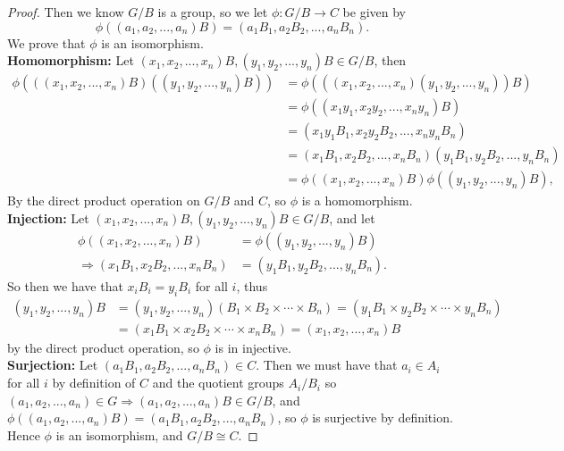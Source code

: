 \documentclass[10pt,oneside,reqno]{amsart}
\theoremstyle{plain}
\theoremstyle{definition}
\begin{document}
\begin{proof}
Then we know $G/B$ is a group, so we let $\phi: G/B \rightarrow C$ be given by $$\phi((a_1,a_2,...,a_n)B) = (a_1B_1,a_2B_2,...,a_nB_n).$$ 
We prove that $\phi$ is an isomorphism.\\
\textbf{Homomorphism: } Let $(x_1,x_2,...,x_n)B,(y_1,y_2,...,y_n)B \in G/B$, then 
\begin{equation}
\begin{aligned}
\phi(((x_1,x_2,...,x_n)B)((y_1,y_2,...,y_n)B)) &= \phi(((x_1,x_2,...,x_n)(y_1,y_2,...,y_n))B)\\ 
&= \phi((x_1y_1,x_2y_2,...,x_ny_n)B) \\
&= (x_1y_1B_1,x_2y_2B_2,...,x_ny_nB_n)\\
 &= (x_1B_1,x_2B_2,...,x_nB_n)(y_1B_1,y_2B_2,...,y_nB_n)\\
  &= \phi((x_1,x_2,...,x_n)B)\phi((y_1,y_2,...,y_n)B), 
\end{aligned}
\end{equation}
By the direct product operation on $G/B$ and $C$, so $\phi$ is a homomorphism. \\ 
\textbf{Injection: } Let $(x_1,x_2,...,x_n)B,(y_1,y_2,...,y_n)B \in G/B$, and let 
\begin{equation}
\begin{aligned}
\phi((x_1,x_2,...,x_n)B) &= \phi((y_1,y_2,...,y_n)B)\\
\Rightarrow  (x_1B_1,x_2B_2,...,x_nB_n)&=(y_1B_1,y_2B_2,...,y_nB_n). 
\end{aligned}
\end{equation}
So then we have that $x_iB_i = y_iB_i$ for all $i$, thus
 \begin{equation}
\begin{aligned}(y_1,y_2,...,y_n)B &= (y_1,y_2,...,y_n)(B_1 \times B_2 \times \cdots \times B_n)=
(y_1B_1 \times y_2B_2 \times \cdots \times y_nB_n) \\
&= (x_1B_1 \times x_2B_2 \times \cdots \times x_nB_n) = (x_1,x_2,...,x_n)B
\end{aligned}
\end{equation}
 by the direct product operation, so $\phi$ is in injective. \\
\textbf{Surjection: } Let $(a_1B_1,a_2B_2,...,a_nB_n) \in C$. Then we must have that $a_i \in A_i$ for all $i$ by definition of $C$ and the quotient groups $A_i/B_i$ so $(a_1,a_2,...,a_n) \in G \Rightarrow (a_1,a_2,...,a_n)B \in G/B$, and $\phi((a_1,a_2,...,a_n)B) = (a_1B_1,a_2B_2,...,a_nB_n)$, so $\phi$ is surjective by definition. Hence $\phi$ is an isomorphism, and $G/B \cong C$. 
\end{proof}
\end{document}
